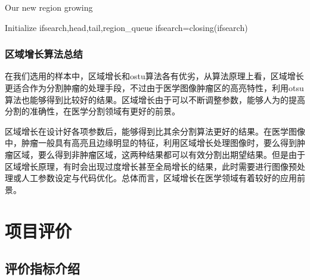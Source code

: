 \documentclass[UTF8]{ctexart}
\begin{document}
    \begin{algorithm}[H]
        \caption{Our new region growing}\label{algorithm}
        Initialize ifsearch,head,tail,region\_queue\;
        ifsearch=closing(ifsearch)
    \end{algorithm}

    

    \subsubsection{区域增长算法总结}
    在我们选用的样本中，区域增长和ostu算法各有优劣，从算法原理上看，区域增长更适合作为分割肿瘤的处理手段，不过由于医学图像肿瘤区的高亮特性，利用otsu算法也能够得到比较好的结果。区域增长由于可以不断调整参数，能够人为的提高分割的准确性，在医学分割领域有更好的前景。

	区域增长在设计好各项参数后，能够得到比其余分割算法更好的结果。在医学图像中，肿瘤一般具有高亮且边缘明显的特征，利用区域增长处理图像时，要么得到肿瘤区域，要么得到非肿瘤区域，这两种结果都可以有效分割出期望结果。但是由于区域增长原理，有时会出现过度增长甚至全局增长的结果，此时需要进行图像预处理或人工参数设定与代码优化。总体而言，区域增长在医学领域有着较好的应用前景。



\section{项目评价}
\subsection{评价指标介绍}
	
\end{document}
